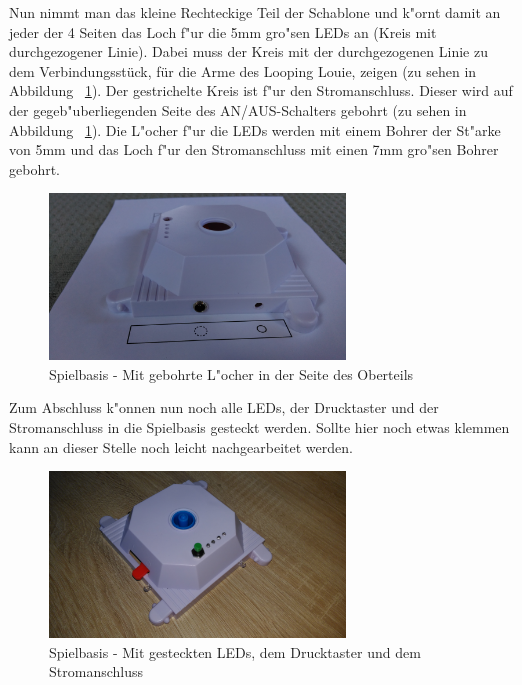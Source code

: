 Nun nimmt man das kleine Rechteckige Teil der Schablone und k"ornt damit an jeder der 4 Seiten das Loch f"ur die 5mm gro"sen LEDs an (Kreis mit durchgezogener Linie). Dabei muss der Kreis mit der durchgezogenen Linie zu dem Verbindungsstück, für die Arme des Looping Louie, zeigen (zu sehen in Abbildung ~\ref{fig14}). Der gestrichelte Kreis ist f"ur den Stromanschluss. Dieser wird auf der gegeb"uberliegenden Seite des AN/AUS-Schalters gebohrt (zu sehen in Abbildung ~\ref{fig14}). Die L"ocher f"ur die LEDs werden mit einem Bohrer der St"arke von 5mm und das Loch f"ur den Stromanschluss mit einen 7mm gro"sen Bohrer gebohrt.  

\vspace{1cm}
\begin{figure}[!ht]
	\centering
  	\includegraphics[width=0.7\textwidth]{pictures/loolou_014.jpg}
	\caption{Spielbasis - Mit gebohrte L"ocher in der Seite des Oberteils}
	\label{fig14}
\end{figure}
\vspace{0.5cm}

Zum Abschluss k"onnen nun noch alle LEDs, der Drucktaster und der Stromanschluss in die Spielbasis gesteckt werden. Sollte hier noch etwas klemmen kann an dieser Stelle noch leicht nachgearbeitet werden.

\vspace{1cm}
\begin{figure}[!ht]
	\centering
  	\includegraphics[width=0.7\textwidth]{pictures/loolou_015.jpg}
	\caption{Spielbasis - Mit gesteckten LEDs, dem Drucktaster und dem Stromanschluss}
	\label{fig15}
\end{figure}
\vspace{0.5cm}

